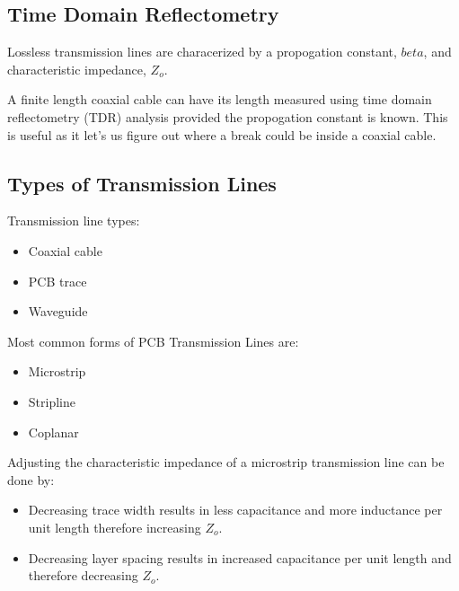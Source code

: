 \documentclass[main.tex]{subfiles}
\begin{document}
\subsection{Time Domain Reflectometry}
Lossless transmission lines are characerized by a propogation constant, $beta$, and characteristic impedance, $Z_o$. 

A finite length coaxial cable can have its length measured using time domain reflectometry (TDR) analysis provided the propogation constant is known. This is useful as it let's us figure out where a break could be inside a coaxial cable. 


\subsection{Types of Transmission Lines}
Transmission line types:
\begin{itemize}
    \item Coaxial cable
    \item PCB trace
    \item Waveguide
\end{itemize}

Most common forms of PCB Transmission Lines are:
\begin{itemize}
    \item Microstrip
    \item Stripline
    \item Coplanar
\end{itemize}

Adjusting the characteristic impedance of a microstrip transmission line can be done by:
\begin{itemize}
    \item Decreasing trace width results in less capacitance and more inductance per unit length therefore increasing $Z_o$.
    \item Decreasing layer spacing results in increased capacitance per unit length and therefore decreasing $Z_o$.
\end{itemize}
\end{document}
